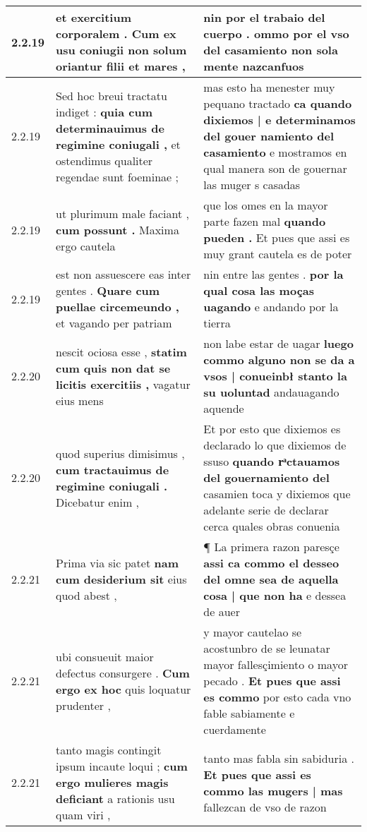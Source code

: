 \begin{tabular}{|p{1cm}|p{6.5cm}|p{6.5cm}|}
2.2.19 & et exercitium corporalem . \textbf{ Cum ex usu coniugii } non solum oriantur filii et mares , & nin por el trabaio del cuerpo . \textbf{ ommo por el vso del casamiento } non sola mente nazcanfuos \\\hline
2.2.19 & Sed hoc breui tractatu indiget : \textbf{ quia cum determinauimus de regimine coniugali , } et ostendimus qualiter regendae sunt foeminae ; & mas esto ha menester muy pequano tractado \textbf{ ca quando dixiemos | e determinamos del gouer namiento del casamiento } e mostramos en qual manera son de gouernar las muger s casadas \\\hline
2.2.19 & ut plurimum male faciant , \textbf{ cum possunt . } Maxima ergo cautela & que los omes en la mayor parte fazen mal \textbf{ quando pueden . } Et pues que assi es muy grant cautela es de poter \\\hline
2.2.19 & est non assuescere eas inter gentes . \textbf{ Quare cum puellae circemeundo , } et vagando per patriam & nin entre las gentes . \textbf{ por la qual cosa las moças uagando } e andando por la tierra \\\hline
2.2.20 & nescit ociosa esse , \textbf{ statim cum quis non dat se licitis exercitiis , } vagatur eius mens & non labe estar de uagar \textbf{ luego commo alguno non se da a vsos | conueinbł stanto la su uoluntad } andauagando aquende \\\hline
2.2.20 & quod superius dimisimus , \textbf{ cum tractauimus de regimine coniugali . } Dicebatur enim , & Et por esto que dixiemos es declarado lo que dixiemos de ssuso \textbf{ quando rͣctauamos del gouernamiento del } casamien toca y dixiemos que adelante serie de declarar cerca quales obras conuenia \\\hline
2.2.21 & Prima via sic patet \textbf{ nam cum desiderium sit } eius quod abest , & ¶ La primera razon paresçe \textbf{ assi ca commo el desseo del omne sea de aquella cosa | que non ha } e dessea de auer \\\hline
2.2.21 & ubi consueuit maior defectus consurgere . \textbf{ Cum ergo ex hoc } quis loquatur prudenter , & y mayor cautelao se acostunbro de se leunatar mayor fallesçimiento o mayor pecado . \textbf{ Et pues que assi es commo } por esto cada vno fable sabiamente e cuerdamente \\\hline
2.2.21 & tanto magis contingit ipsum incaute loqui ; \textbf{ cum ergo mulieres magis deficiant } a rationis usu quam viri , & tanto mas fabla sin sabiduria . \textbf{ Et pues que assi es commo las mugers | mas } fallezcan de vso de razon \\\hline

\end{tabular}
